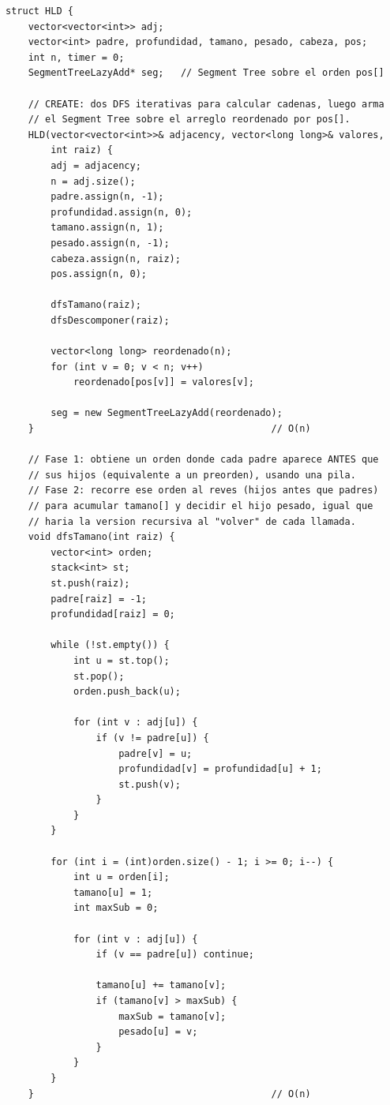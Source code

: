\documentclass[10pt,a4paper,twocolumn]{article}
\begin{document}
\begin{lstlisting}[style=cpp]
struct HLD {
    vector<vector<int>> adj;
    vector<int> padre, profundidad, tamano, pesado, cabeza, pos;
    int n, timer = 0;
    SegmentTreeLazyAdd* seg;   // Segment Tree sobre el orden pos[]

    // CREATE: dos DFS iterativas para calcular cadenas, luego arma
    // el Segment Tree sobre el arreglo reordenado por pos[].
    HLD(vector<vector<int>>& adjacency, vector<long long>& valores,
        int raiz) {
        adj = adjacency;
        n = adj.size();
        padre.assign(n, -1);
        profundidad.assign(n, 0);
        tamano.assign(n, 1);
        pesado.assign(n, -1);
        cabeza.assign(n, raiz);
        pos.assign(n, 0);

        dfsTamano(raiz);
        dfsDescomponer(raiz);

        vector<long long> reordenado(n);
        for (int v = 0; v < n; v++)
            reordenado[pos[v]] = valores[v];

        seg = new SegmentTreeLazyAdd(reordenado);
    }                                          // O(n)

    // Fase 1: obtiene un orden donde cada padre aparece ANTES que
    // sus hijos (equivalente a un preorden), usando una pila.
    // Fase 2: recorre ese orden al reves (hijos antes que padres)
    // para acumular tamano[] y decidir el hijo pesado, igual que
    // haria la version recursiva al "volver" de cada llamada.
    void dfsTamano(int raiz) {
        vector<int> orden;
        stack<int> st;
        st.push(raiz);
        padre[raiz] = -1;
        profundidad[raiz] = 0;

        while (!st.empty()) {
            int u = st.top();
            st.pop();
            orden.push_back(u);

            for (int v : adj[u]) {
                if (v != padre[u]) {
                    padre[v] = u;
                    profundidad[v] = profundidad[u] + 1;
                    st.push(v);
                }
            }
        }

        for (int i = (int)orden.size() - 1; i >= 0; i--) {
            int u = orden[i];
            tamano[u] = 1;
            int maxSub = 0;

            for (int v : adj[u]) {
                if (v == padre[u]) continue;

                tamano[u] += tamano[v];
                if (tamano[v] > maxSub) {
                    maxSub = tamano[v];
                    pesado[u] = v;
                }
            }
        }
    }                                          // O(n)


\end{lstlisting}
\end{document}
